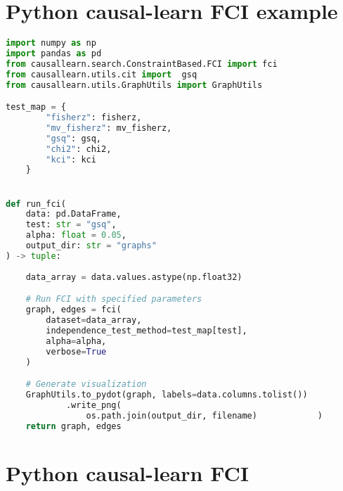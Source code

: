 \documentclass[main.tex]{subfiles}
\begin{document}
\section{Python causal-learn FCI example}
\label{appendix: python_fci_clean}
\begin{lstlisting}[language=Python]
import numpy as np
import pandas as pd
from causallearn.search.ConstraintBased.FCI import fci
from causallearn.utils.cit import  gsq
from causallearn.utils.GraphUtils import GraphUtils

test_map = {
        "fisherz": fisherz,
        "mv_fisherz": mv_fisherz,
        "gsq": gsq,
        "chi2": chi2,
        "kci": kci
    }


def run_fci(
    data: pd.DataFrame,
    test: str = "gsq",
    alpha: float = 0.05,
    output_dir: str = "graphs"
) -> tuple:
    
    data_array = data.values.astype(np.float32)

    # Run FCI with specified parameters
    graph, edges = fci(
        dataset=data_array,
        independence_test_method=test_map[test],
        alpha=alpha,
        verbose=True
    )

    # Generate visualization
    GraphUtils.to_pydot(graph, labels=data.columns.tolist())
            .write_png(
                os.path.join(output_dir, filename)            )
    return graph, edges
\end{lstlisting}

\section{Python causal-learn FCI }
\label{appendix: python_fci_clean}
\end{document}
